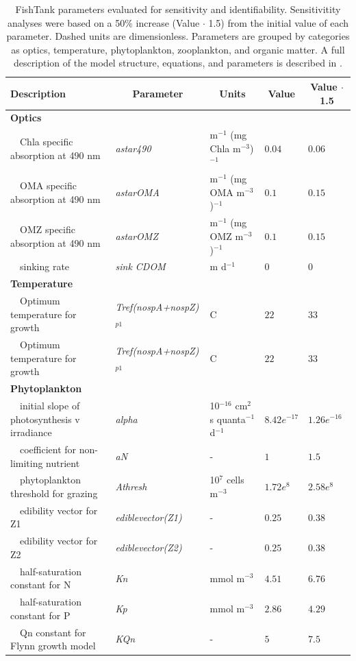 \documentclass[review]{elsarticle}\usepackage[]{graphicx}\usepackage[]{color}
\begin{document}
\begin{table}[!tbp]
{\scriptsize
\caption{FishTank parameters evaluated for sensitivity and identifiability. Sensitivitity analyses were based on a 50\% increase (Value $\cdot$ 1.5) from the initial value of each parameter. Dashed units are dimensionless. Parameters are grouped by categories as optics, temperature, phytoplankton, zooplankton, and organic matter.  A full description of the model structure, equations, and parameters is described in \citet{Lehrter17}.\label{tab:parmtab}} 
\begin{center}
\begin{tabular}{lllll}
\hline\hline
\multicolumn{1}{l}{Description}&\multicolumn{1}{c}{Parameter}&\multicolumn{1}{c}{Units}&\multicolumn{1}{c}{Value}&\multicolumn{1}{c}{Value $\cdot$ 1.5}\tabularnewline
\hline
{\bfseries Optics}&&&&\tabularnewline
~~Chla specific absorption at 490 nm&\textit{astar490}&m$^{-1}$ (mg Chla m$^{-3}$)$^{-1}$&$0.04$&$0.06$\tabularnewline
~~OMA specific absorption at 490 nm&\textit{astarOMA}&m$^{-1}$ (mg OMA m$^{-3}$)$^{-1}$&$0.1$&$0.15$\tabularnewline
~~OMZ specific absorption at 490 nm&\textit{astarOMZ}&m$^{-1}$ (mg OMZ m$^{-3}$)$^{-1}$&$0.1$&$0.15$\tabularnewline
~~sinking rate&\textit{sink CDOM}&m d$^{-1}$&$0$&$0$\tabularnewline
\hline
{\bfseries Temperature}&&&&\tabularnewline
~~Optimum temperature for growth&\textit{Tref(nospA+nospZ)$_{p1}$}&C&$22$&$33$\tabularnewline
~~Optimum temperature for growth&\textit{Tref(nospA+nospZ)$_{p1}$}&C&$22$&$33$\tabularnewline
\hline
{\bfseries Phytoplankton}&&&&\tabularnewline
~~initial slope of photosynthesis v irradiance&\textit{alpha}&10$^{-16}$ cm$^2$ s quanta$^{-1}$ d$^{-1}$&$8.42e^{-17}$&$1.26e^{-16}$\tabularnewline
~~coefficient for non-limiting nutrient&\textit{aN}&-&$1$&$1.5$\tabularnewline
~~phytoplankton threshold for grazing&\textit{Athresh}&10$^7$ cells m$^{-3}$&$1.72e^{8}$&$2.58e^{8}$\tabularnewline
~~edibility vector for Z1&\textit{ediblevector(Z1)}&-&$0.25$&$0.38$\tabularnewline
~~edibility vector for Z2&\textit{ediblevector(Z2)}&-&$0.25$&$0.38$\tabularnewline
~~half-saturation constant for N&\textit{Kn}&mmol m$^{-3}$&$4.51$&$6.76$\tabularnewline
~~half-saturation constant for P&\textit{Kp}&mmol m$^{-3}$&$2.86$&$4.29$\tabularnewline
~~Qn constant for Flynn growth model&\textit{KQn}&-&$5$&$7.5$\tabularnewline

\end{tabular}
\end{center}}
\end{table}
\end{document}
